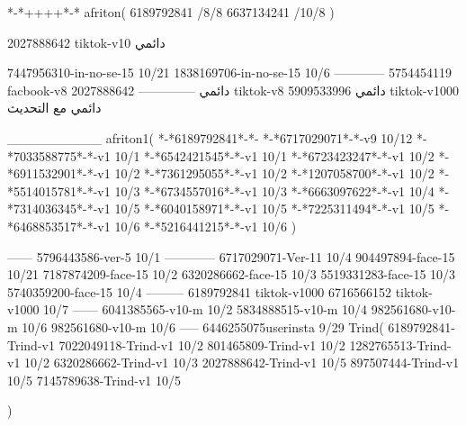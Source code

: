 *-*++++*-*
afriton(
6189792841 /8/8
6637134241 /10/8
)

2027888642 tiktok-v10
دائمي


7447956310-in-no-se-15 10/21
1838169706-in-no-se-15 10/6
------------
5754454119 facbook-v8
دائمي
--------------
2027888642 tiktok-v8
دائمي
5909533996 tiktok-v1000
دائمي مع التحديث

__________
afriton1(
*-*6189792841*-*-
*-*6717029071*-*-v9 10/12
*-*7033588775*-*-v1 10/1
*-*6542421545*-*-v1 10/1
*-*6723423247*-*-v1 10/2
*-*6911532901*-*-v1 10/2
*-*7361295055*-*-v1 10/2
*-*1207058700*-*-v1 10/2
*-*5514015781*-*-v1 10/3
*-*6734557016*-*-v1 10/3
*-*6663097622*-*-v1 10/4
*-*7314036345*-*-v1 10/5
*-*6040158971*-*-v1 10/5
*-*7225311494*-*-v1 10/5
*-*6468853517*-*-v1 10/6
*-*5216441215*-*-v1 10/6
)

------
5796443586-ver-5 10/1
------------
6717029071-Ver-11
10/4
904497894-face-15 10/21
7187874209-face-15 10/2
6320286662-face-15 10/3
5519331283-face-15 10/3
5740359200-face-15 10/4
---------
6189792841 tiktok-v1000
6716566152 tiktok-v1000
10/7
------
6041385565-v10-m 10/2
5834888515-v10-m 10/4
982561680‏-v10-m 10/6
982561680-v10-m 10/6
-----
6446255075userinsta 9/29
Trind(
6189792841-Trind-v1 
7022049118-Trind-v1 10/2
801465809-Trind-v1 10/2
1282765513-Trind-v1 10/2
6320286662-Trind-v1 10/3
2027888642-Trind-v1 10/5
897507444-Trind-v1 10/5
7145789638-Trind-v1 10/5

)
